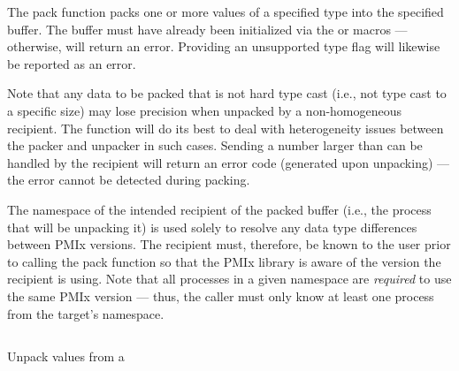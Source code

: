 \descr

The pack function packs one or more values of a specified type into the specified buffer.  The buffer must have already been
initialized via the  or 
macros --- otherwise,  will return an error.
Providing an unsupported type flag will likewise be reported as an error.

Note that any data to be packed that is not hard type cast (i.e.,
not type cast to a specific size) may lose precision when unpacked
by a non-homogeneous recipient.  The  function will do its best to deal
with heterogeneity issues between the packer and unpacker in such
cases. Sending a number larger than can be handled by the recipient
will return an error code (generated upon unpacking) ---
the error cannot be detected during packing.

The namespace of the intended recipient of the packed buffer (i.e., the
process that will be unpacking it) is used solely to resolve any data type
differences between \ac{PMIx} versions. The recipient must, therefore, be
known to the user prior to calling the pack function so that the
\ac{PMIx} library is aware of the version the recipient is using. Note that
all processes in a given namespace are \textit{required} to use the same \ac{PMIx}
version --- thus, the caller must only know at least one process from the
target's namespace.


\subsection{}

\summary

Unpack values from a 

\format



